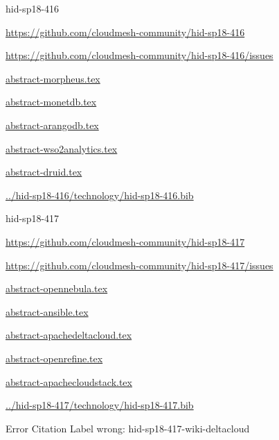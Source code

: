 \begin{IU}

hid-sp18-416

\url{https://github.com/cloudmesh-community/hid-sp18-416}

\url{https://github.com/cloudmesh-community/hid-sp18-416/issues}

\href{https://github.com/cloudmesh-community/hid-sp18-416/blob/master//technology/abstract-morpheus.tex}{abstract-morpheus.tex}

\href{https://github.com/cloudmesh-community/hid-sp18-416/blob/master//technology/abstract-monetdb.tex}{abstract-monetdb.tex}

\href{https://github.com/cloudmesh-community/hid-sp18-416/blob/master//technology/abstract-arangodb.tex}{abstract-arangodb.tex}

\href{https://github.com/cloudmesh-community/hid-sp18-416/blob/master//technology/abstract-wso2analytics.tex}{abstract-wso2analytics.tex}

\href{https://github.com/cloudmesh-community/hid-sp18-416/blob/master//technology/abstract-druid.tex}{abstract-druid.tex}

\href{https://github.com/cloudmesh-community/hid-sp18-416/blob/master//technology/hid-sp18-416.bib}{../hid-sp18-416/technology/hid-sp18-416.bib}

\end{IU}


\begin{IU}

hid-sp18-417

\url{https://github.com/cloudmesh-community/hid-sp18-417}

\url{https://github.com/cloudmesh-community/hid-sp18-417/issues}

\href{https://github.com/cloudmesh-community/hid-sp18-417/blob/master//technology/abstract-opennebula.tex}{abstract-opennebula.tex}

\href{https://github.com/cloudmesh-community/hid-sp18-417/blob/master//technology/abstract-ansible.tex}{abstract-ansible.tex}

\href{https://github.com/cloudmesh-community/hid-sp18-417/blob/master//technology/abstract-apachedeltacloud.tex}{abstract-apachedeltacloud.tex}

\href{https://github.com/cloudmesh-community/hid-sp18-417/blob/master//technology/abstract-openrefine.tex}{abstract-openrefine.tex}

\href{https://github.com/cloudmesh-community/hid-sp18-417/blob/master//technology/abstract-apachecloudstack.tex}{abstract-apachecloudstack.tex}

\href{https://github.com/cloudmesh-community/hid-sp18-417/blob/master//technology/hid-sp18-417.bib}{../hid-sp18-417/technology/hid-sp18-417.bib}

 Error Citation Label wrong:  hid-sp18-417-wiki-deltacloud

\end{IU}


